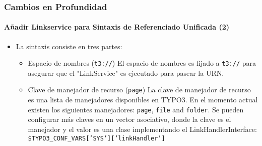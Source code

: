 \begin{frame}[fragile]
	\frametitle{Cambios en Profundidad}
	\framesubtitle{Añadir Linkservice para Sintaxis de Referenciado Unificada (2)}

	\begin{itemize}

		\item La sintaxis consiste en tres partes:

			\begin{itemize}

				\item Espacio de nombres (\texttt{t3://})\newline
		   			El espacio de nombres es fijado a \texttt{t3://} para asegurar que el "LinkService" es ejecutado para pasear la URN.
					\newline
				\item Clave de manejador de recurso (\texttt{page})\newline
   					La clave de manejador de recurso es una lista de manejadores disponibles en TYPO3.
					En el momento actual existen los siguientes manejadores: \texttt{page}, \texttt{file} and \texttt{folder}.\newline
					Se pueden configurar más claves en un vector asociativo, donde la clave es el manejador y el valor
					es una clase implementando el LinkHandlerInterface:\newline
					\texttt{\$TYPO3\_CONF\_VARS['SYS']['linkHandler']}

			\end{itemize}

	\end{itemize}

\end{frame}

